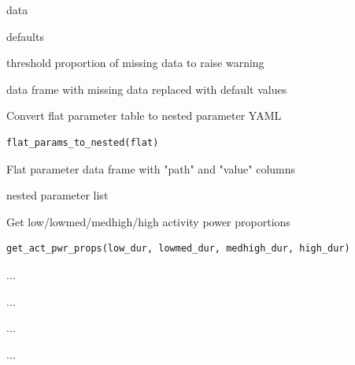 \documentclass[a4paper]{book}
\begin{document}
%
\begin{Arguments}
\begin{ldescription}
\item[\code{data}] data

\item[\code{defaults}] defaults

\item[\code{warn\_threshold}] threshold proportion of missing data to raise warning
\end{ldescription}
\end{Arguments}
%
\begin{Value}
data frame with missing data replaced with default values
\end{Value}
%
\begin{Description}
Convert flat parameter table to nested parameter YAML
\end{Description}
%
\begin{Usage}
\begin{verbatim}
flat_params_to_nested(flat)
\end{verbatim}
\end{Usage}
%
\begin{Arguments}
\begin{ldescription}
\item[\code{flat}] Flat parameter data frame with "path" and "value" columns
\end{ldescription}
\end{Arguments}
%
\begin{Value}
nested parameter list
\end{Value}
%
\begin{Description}
Get low/lowmed/medhigh/high activity power proportions
\end{Description}
%
\begin{Usage}
\begin{verbatim}
get_act_pwr_props(low_dur, lowmed_dur, medhigh_dur, high_dur)
\end{verbatim}
\end{Usage}
%
\begin{Arguments}
\begin{ldescription}
\item[\code{low\_dur}] ...

\item[\code{lowmed\_dur}] ...

\item[\code{medhigh\_dur}] ...

\item[\code{high\_dur}] ...
\end{ldescription}
\end{Arguments}
\end{document}
